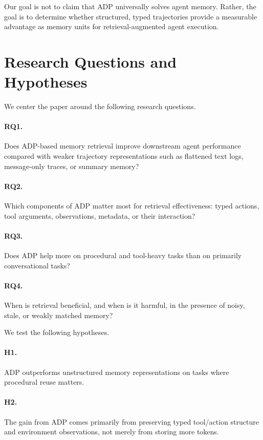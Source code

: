 \documentclass{article}
\newcommand{\ADP}{\textsc{ADP}}
\begin{document}
Our goal is not to claim that \ADP{} universally solves agent memory.
Rather, the goal is to determine whether structured, typed trajectories provide a measurable advantage as
memory units for retrieval-augmented agent execution.

\section{Research Questions and Hypotheses}
We center the paper around the following research questions.

\paragraph{RQ1.}
Does \ADP{}-based memory retrieval improve downstream agent performance compared with weaker trajectory
representations such as flattened text logs, message-only traces, or summary memory?

\paragraph{RQ2.}
Which components of \ADP{} matter most for retrieval effectiveness:
typed actions, tool arguments, observations, metadata, or their interaction?

\paragraph{RQ3.}
Does \ADP{} help more on procedural and tool-heavy tasks than on primarily conversational tasks?

\paragraph{RQ4.}
When is retrieval beneficial, and when is it harmful, in the presence of noisy, stale, or weakly matched
memory?

We test the following hypotheses.

\paragraph{H1.}
\ADP{} outperforms unstructured memory representations on tasks where procedural reuse matters.

\paragraph{H2.}
The gain from \ADP{} comes primarily from preserving typed tool/action structure and environment
observations, not merely from storing more tokens.
\end{document}

